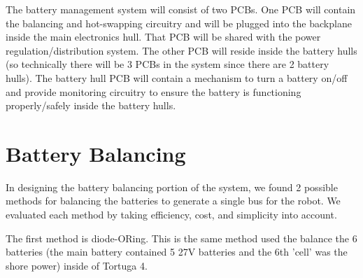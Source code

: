 \documentclass[12pt, letterpaper]{article}
\begin{document}
		The battery management system will consist of two PCBs. One PCB will contain the balancing and hot-swapping circuitry and will be plugged into the backplane inside the main electronics hull. That PCB will be shared with the power regulation/distribution system. The other PCB will reside inside the battery hulls (so technically there will be 3 PCBs in the system since there are 2 battery hulls). The battery hull PCB will contain a mechanism to turn a battery on/off and provide monitoring circuitry to ensure the battery is functioning properly/safely inside the battery hulls.
		
	\section{Battery Balancing}
	
		In designing the battery balancing portion of the system, we found 2 possible methods for balancing the batteries to generate a single bus for the robot. We evaluated each method by taking efficiency, cost, and simplicity into account. 
		
		The first method is diode-ORing. This is the same method used the balance the 6 batteries (the main battery contained 5 27V batteries and the 6th 'cell' was the shore power) inside of Tortuga 4. 
\end{document}
